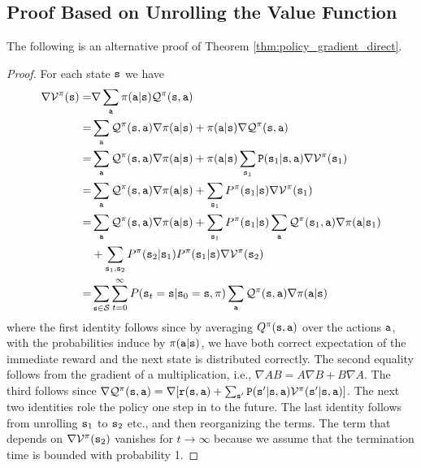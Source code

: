 \subsection{Proof Based on Unrolling the Value Function}
The following is an alternative proof of Theorem \ref{thm:policy_gradient_direct}.
\begin{proof}
For each state ${\tt s}$ we have
\begin{align*}
\nabla \mathcal{V}^\pi({\tt s}) =& \nabla \sum_{\tt a} \pi({\tt a}|{\tt s}) \mathcal{Q}^\pi({\tt s},{\tt a})\\
=&\sum_{\tt a}  \mathcal{Q}^\pi({\tt s},{\tt a}) \nabla \pi({\tt a}|{\tt s}) + \pi({\tt a}|{\tt s}) \nabla \mathcal{Q}^\pi({\tt s},{\tt a})\\
=&\sum_{\tt a}  \mathcal{Q}^\pi({\tt s},{\tt a}) \nabla \pi({\tt a}|{\tt s}) + \pi({\tt a}|{\tt s}) \sum_{{\tt s}_1} {\tt P}({\tt s}_1|{\tt s},{\tt a}) \nabla \mathcal{V}^\pi({\tt s}_1)\\
=& \sum_{\tt a}  \mathcal{Q}^\pi({\tt s},{\tt a}) \nabla
\pi({\tt a}|{\tt s}) + \sum_{{\tt s}_1} P^{\pi}({\tt s}_1|{\tt s})
\nabla \mathcal{V}^\pi({\tt s}_1)\\
=& \sum_{\tt a}  \mathcal{Q}^\pi({\tt s},{\tt a}) \nabla
\pi({\tt a}|{\tt s}) + \sum_{{\tt s}_1} P^{\pi}({\tt s}_1|{\tt s})
\sum_{\tt a} \mathcal{Q}^\pi({\tt s}_1,{\tt a}) \nabla
\pi({\tt a}|{\tt s}_1) \\
& + \sum_{{\tt s}_1, {\tt s}_2}
P^{\pi}({\tt s}_2|{\tt s}_1)P^{\pi}({\tt s}_1|{\tt s})
\nabla \mathcal{V}^\pi({\tt s}_2)\\
=& \sum_{{\tt s}\in
\mathcal{S}}\sum_{t=0}^\infty P({\tt s}_t = {\tt s} | {\tt s}_0 = {\tt s}, \pi) \sum_{\tt a}
\mathcal{Q}^\pi({\tt s},{\tt a})\nabla\pi({\tt a}|{\tt s})
\end{align*}
where the first identity follows since by averaging $Q^\pi({\tt s},{\tt a})$ over the actions ${\tt a}$, with the
probabilities induce by $\pi({\tt a}|{\tt s})$, we have both correct expectation of the immediate reward and the next state is distributed correctly. The second equality follows from the gradient of a multiplication, i.e., $\nabla AB=A\nabla B+B\nabla A$. The third follows since 
$\nabla \mathcal{Q}^\pi({\tt s},{\tt a})= \nabla
[{\tt r}({\tt s},{\tt a})+
\sum_{{\tt s}'}{\tt P}({\tt s}'|{\tt s},{\tt a})\mathcal{V}^\pi({\tt s}'|{\tt s},{\tt a})]$.
%
The next two identities role the policy one step in to the future.
%
The last identity follows from unrolling ${\tt s}_1$ to ${\tt s}_2$ etc., and then reorganizing the terms. The term that depends on $\nabla \mathcal{V}^\pi({\tt s}_2)$ vanishes for $t\to\infty$ because we assume that the termination time is bounded with probability 1.


\end{proof}
